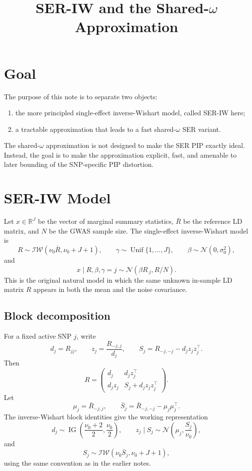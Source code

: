 \documentclass[11pt]{article}
\title{SER-IW and the Shared-\texorpdfstring{\(\omega\)}{omega} Approximation}
\author{}
\date{}
\newcommand{\Rbar}{\bar R}
\newcommand{\Normal}{\mathcal N}
\newcommand{\Unif}{\operatorname{Unif}}
\newcommand{\IW}{\mathcal{IW}}
\begin{document}
\maketitle

\section{Goal}

The purpose of this note is to separate two objects:
\begin{enumerate}[leftmargin=*]
\item the more principled single-effect inverse-Wishart model, called SER-IW
here;
\item a tractable approximation that leads to a fast shared-\(\omega\) SER
variant.
\end{enumerate}
The shared-\(\omega\) approximation is not designed to make the SER PIP exactly
ideal. Instead, the goal is to make the approximation explicit, fast, and
amenable to later bounding of the SNP-specific PIP distortion.

\section{SER-IW Model}

Let \(x\in\mathbb R^J\) be the vector of marginal summary statistics,
\(\Rbar\) be the reference LD matrix, and \(N\) be the GWAS sample size. The
single-effect inverse-Wishart model is
\[
R\sim \IW(\nu_0\Rbar,\nu_0+J+1),
\qquad
\gamma\sim\Unif\{1,\ldots,J\},
\qquad
\beta\sim\Normal(0,\sigma_0^2),
\]
and
\[
x\mid R,\beta,\gamma=j
\sim
\Normal(\beta R_{\cdot j},R/N).
\]
This is the original natural model in which the same unknown in-sample LD
matrix \(R\) appears in both the mean and the noise covariance.

\subsection{Block decomposition}

For a fixed active SNP \(j\), write
\[
d_j=R_{jj},
\qquad
z_j=\frac{R_{-j,j}}{d_j},
\qquad
S_j=R_{-j,-j}-d_jz_jz_j^\top.
\]
Then
\[
R=
\begin{pmatrix}
d_j & d_jz_j^\top\\
d_jz_j & S_j+d_jz_jz_j^\top
\end{pmatrix}.
\]
Let
\[
\mu_j=\Rbar_{-j,j},
\qquad
\bar S_j=\Rbar_{-j,-j}-\mu_j\mu_j^\top.
\]
The inverse-Wishart block identities give the working representation
\[
d_j\sim \operatorname{IG}\left(\frac{\nu_0+2}{2},\frac{\nu_0}{2}\right),
\qquad
z_j\mid S_j
\sim
\Normal\left(\mu_j,\frac{S_j}{\nu_0}\right),
\]
and
\[
S_j\sim \IW(\nu_0\bar S_j,\nu_0+J+1),
\]
using the same convention as in the earlier notes.
\end{document}
